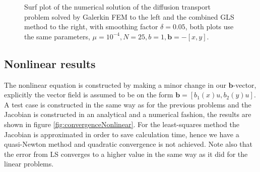 \begin{figure}[h]
\begin{subfigure}[b]{0.48\textwidth}
  \end{subfigure}
  \vspace{-0.1\baselineskip}
	\caption{Surf plot of the numerical solution of the diffusion transport problem solved by Galerkin FEM to the left and the combined GLS method to the right, with smoothing factor $\delta = 0.05$, both plots use the same parameters, $\mu = 10^{-4},N=25,b = 1,\mathbf{b} = -[x,y]$.}
  \label{fig:SurfDiffTransPositiveFEM}
\end{figure}
%
\subsection{Nonlinear results}
The nonlinear equation is constructed by making a minor change in our $\mathbf{b}$-vector, explicitly the vector field is assumed to be on the form $\mathbf{b}=[b_1(x)u,b_2(y)u]$. A test case is constructed in the same way as for the previous problems and the Jacobian is constructed in an analytical and a numerical fashion, the results are shown in figure \ref{fig:convergenceNonlinear}. For the least-squares method the Jacobian is approximated in order to save calculation time, hence we have a quasi-Newton method and quadratic convergence is not achieved. Note also that the error from LS converges to a higher value in the same way as it did for the linear problems. 
%
